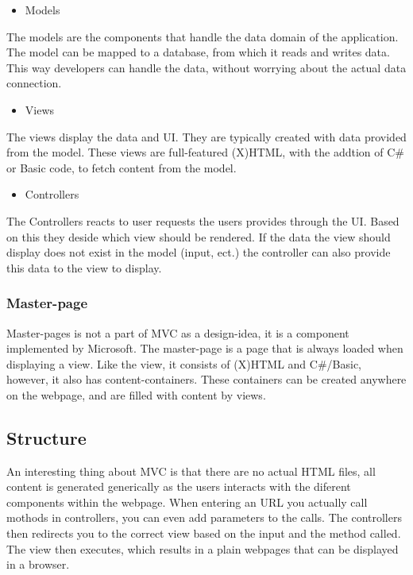\begin{itemize}
\item Models
\end{itemize}
The models are the components that handle the data domain of the application. The model can be mapped to a database, from which it reads and writes data. This way developers can handle the data, without worrying about the actual data connection.

\begin{itemize}
\item Views
\end{itemize}
The views display the data and UI. They are typically created with data provided from the model. These views are full-featured (X)HTML, with the addtion of C\# or Basic code, to fetch content from the model.

\begin{itemize}
\item Controllers
\end{itemize}
The Controllers reacts to user requests the users provides through the UI. Based on this they deside which view should be rendered. If the data the view should display does not exist in the model (input, ect.) the controller can also provide this data to the view to display.

\subsubsection{Master-page}
Master-pages is not a part of MVC as a design-idea, it is a component implemented by Microsoft. The master-page is a page that is always loaded when displaying a view. Like the view, it consists of (X)HTML and C\#/Basic, however, it also has content-containers. These containers can be created anywhere on the webpage, and are filled with content by views.

\subsection{Structure}
An interesting thing about MVC is that there are no actual HTML files, all content is generated generically as the users interacts with the diferent components within the webpage. When entering an URL you actually call mothods in controllers, you can even add parameters to the calls. The controllers then redirects you to the correct view based on the input and the method called. The view then executes, which results in a plain webpages that can be displayed in a browser.

